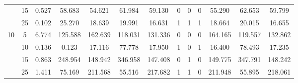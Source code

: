 \documentclass[11pt]{article}
\theoremstyle{definition}
\begin{document}
\begin{sidewaysfigure}
\begin{tabular}{cc|cc|ccc|ccc|ccc}
  &  15 & 0.527 & 58.683 & 54.621 & 61.984 & 59.130 & 0  & 0  & 0  & 55.290 & 62.653 & 59.799 \\ 
  &  25 & 0.102 & 25.270 & 18.639 & 19.991 & 16.631 & 1  & 1  & 1  & 18.664 & 20.015 & 16.655 \\[.3cm]
\multirow{4}{*}{10}   &  5 & 6.774 & 125.588 & 162.639 & 118.031 & 131.336 & 0  & 0  & 0  & 164.165 & 119.557 & 132.862 \\ 
  &  10 & 0.136 & 0.123 & 17.116 & 77.778 & 17.950 & 1  & 0  & 1  & 16.400 & 78.493 & 17.235 \\ 
  &  15 & 0.863 & 248.954 & 148.942 & 346.958 & 147.408 & 0  & 1  & 0  & 149.775 & 347.791 & 148.242 \\ 
  &  25 & 1.411 & 75.169 & 211.568 & 55.516 & 217.682 & 1  & 1  & 0  & 211.948 & 55.895 & 218.061 \\ 
\end{tabular}
\end{sidewaysfigure}
\end{document}
